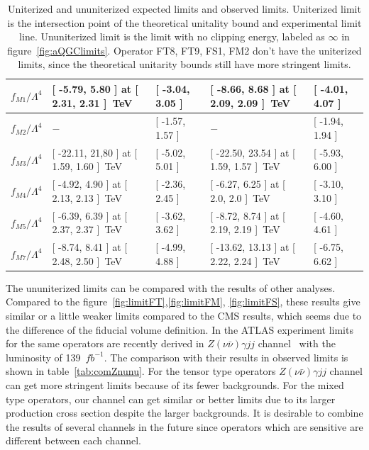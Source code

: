 \begin{table}[ht!]
\begin{center}
{\begin{tabular}{ | l || l | l || l | l | }
$f_{M 1} / \Lambda^4$                &[ -5.79, 5.80 ] at [ 2.31, 2.31 ]~TeV & [ -3.04, 3.05 ] &[ -8.66, 8.68 ] at [ 2.09, 2.09 ]~TeV &[ -4.01, 4.07 ]\tabularnewline \hline
$f_{M 2} / \Lambda^4$               &$-$               & [ -1.57, 1.57 ]   &$-$              &[ -1.94, 1.94 ]\tabularnewline \hline
$f_{M 3} / \Lambda^4$                &[ -22.11, 21,80 ] at [ 1.59, 1.60 ]~TeV&[ -5.02, 5.01 ]  &[ -22.50, 23.54 ] at [ 1.59, 1.57 ]~TeV &[ -5.93, 6.00 ]\tabularnewline \hline
$f_{M 4} / \Lambda^4$                &[ -4.92, 4.90 ] at [ 2.13, 2.13 ]~TeV & [ -2.36, 2.45 ] &[ -6.27, 6.25 ] at [ 2.0, 2.0 ]~TeV &[ -3.10, 3.10 ]\tabularnewline \hline
$f_{M 5} / \Lambda^4$                &[ -6.39, 6.39 ] at [ 2.37, 2.37 ]~TeV & [ -3.62, 3.62 ] &[ -8.72, 8.74 ] at [ 2.19, 2.19 ]~TeV &[ -4.60, 4.61 ]\tabularnewline \hline
$f_{M 7} / \Lambda^4$                &[ -8.74, 8.41  ] at [ 2.48, 2.50  ]~TeV  & [ -4.99, 4.88 ]   &[ -13.62, 13.13  ] at [ 2.22, 2.24  ]~TeV &[ -6.75, 6.62 ]\tabularnewline \hline
\end{tabular}
}
\caption{Uniterized and ununiterized expected limits and observed limits. Uniterized limit is the intersection point of the theoretical unitality bound and experimental limit line. Ununiterized limit is the limit with no clipping energy, labeled as $\infty$ in figure~\ref{fig:aQGClimits}. Operator FT8, FT9, FS1, FM2 don't have the uniterized limits, since the theoretical unitarity bounds still have more stringent limits.}
\label{tab:aQGClimits}
\end{center}
\end{table}
The ununiterized limits can be compared with the results of other analyses.
Compared to the figure~\ref{fig:limitFT},\ref{fig:limitFM}, \ref{fig:limitFS}, these results give similar or a little weaker limits compared to the CMS results,
which seems due to the difference of the fiducial volume definition.
In the ATLAS experiment limits for the same operators are recently derived in $Z(\nu\bar{\nu})\gamma jj$ channel~\cite{https://doi.org/10.48550/arxiv.2208.12741} with the luminosity of 139~$fb^{-1}$.
The comparison with their results in observed limits is shown in table~\ref{tab:comZnunu}. 
For the tensor type operators $Z(\nu\bar{\nu})\gamma jj$ channel can get more stringent limits because of its fewer backgrounds. 
For the mixed type operators, our channel can get similar or better limits due to its larger production cross section despite the larger backgrounds.
It is desirable to combine the results of several channels in the future since operators which are sensitive are different between each channel.
